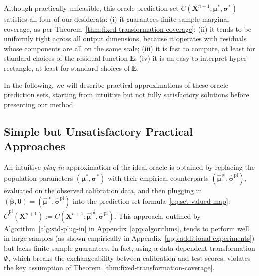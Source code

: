Although practically unfeasible, this oracle prediction set $C(\mathbf{X}^{n+1}; \boldsymbol\mu^*, \boldsymbol\sigma^*)$ satisfies all four of our desiderata: (i) it guarantees finite-sample marginal coverage, as per Theorem~\ref{thm:fixed-transformation-coverage}; (ii) it tends to be uniformly tight across all output dimensions, because it operates with residuals whose components are all on the same scale; (iii) it is fast to compute, at least for standard choices of the residual function $\mathbf E$; (iv) it is an easy-to-interpret hyper-rectangle, at least for standard choices of $\mathbf E$.

In the following, we will describe practical approximations of these oracle prediction sets, starting from intuitive but not fully satisfactory solutions before presenting our method.


\subsection{Simple but Unsatisfactory Practical Approaches} \label{sec:data-splitting}

An intuitive {\em plug-in} approximation of the ideal oracle is obtained by replacing the population parameters $(\boldsymbol{\mu}^*,\boldsymbol{\sigma}^*)$ with their empirical counterparts $(\boldsymbol{\hat{\mu}}^{\mathrm{pi}},\boldsymbol{\hat{\sigma}}^{\mathrm{pi}})$, evaluated on the observed calibration data, and then plugging in $(\boldsymbol{\beta},\boldsymbol{\theta})=(\hat{\boldsymbol\mu}^{\mathrm{pi}}, \hat{\boldsymbol\sigma}^{\mathrm{pi}})$ into the prediction set formula~\eqref{eq:set-valued-map}: $\hat{C}^{\mathrm{pi}}(\mathbf{X}^{n+1}):= C(\mathbf{X}^{n+1};\hat{\boldsymbol\mu}^{\mathrm{pi}}, \hat{\boldsymbol\sigma}^{\mathrm{pi}})$. This approach, outlined by Algorithm~\ref{alg:std-plug-in} in Appendix~\ref{app:algorithms}, tends to perform well in large-samples (as shown empirically in Appendix~\ref{app:additional-experiments}) but lacks finite-sample guarantees.
In fact, using a data-dependent transformation $\Phi$, which breaks the exchangeability between calibration and test scores, violates the key assumption of Theorem~\ref{thm:fixed-transformation-coverage}.

